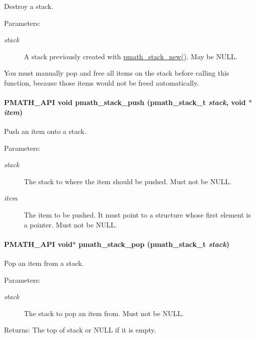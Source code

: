Destroy a stack. 

\begin{Desc}
\item[Parameters:]
\begin{description}
\item[{\em stack}]A stack previously created with \hyperlink{group__stacks_g4a549111f394261de5ac3cc3acda428b}{pmath\_\-stack\_\-new()}. May be NULL.\end{description}
\end{Desc}
You must manually pop and free all items on the stack before calling this function, because those items would not be freed automatically. \hypertarget{group__stacks_g56988223111a61b5b46f719e0efd546f}{
\paragraph[{pmath\_\-stack\_\-push}]{\setlength{\rightskip}{0pt plus 5cm}PMATH\_\-API void pmath\_\-stack\_\-push ({\bf pmath\_\-stack\_\-t} {\em stack}, \/  void $\ast$ {\em item})}\hfill}
\label{group__stacks_g56988223111a61b5b46f719e0efd546f}


Push an item onto a stack. 

\begin{Desc}
\item[Parameters:]
\begin{description}
\item[{\em stack}]The stack to where the item should be pushed. Must not be NULL. \item[{\em item}]The item to be pushed. It must point to a structure whose first element is a pointer. Must not be NULL. \end{description}
\end{Desc}
\hypertarget{group__stacks_g45bcd2d27a9beb76949c1283b6367dab}{
\paragraph[{pmath\_\-stack\_\-pop}]{\setlength{\rightskip}{0pt plus 5cm}PMATH\_\-API void$\ast$ pmath\_\-stack\_\-pop ({\bf pmath\_\-stack\_\-t} {\em stack})}\hfill}
\label{group__stacks_g45bcd2d27a9beb76949c1283b6367dab}


Pop an item from a stack. 

\begin{Desc}
\item[Parameters:]
\begin{description}
\item[{\em stack}]The stack to pop an item from. Must not be NULL. \end{description}
\end{Desc}
\begin{Desc}
\item[Returns:]The top of stack or NULL if it is empty. \end{Desc}
